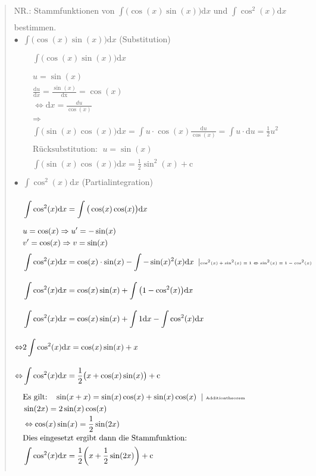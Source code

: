 \begin{quote}
NR.: Stammfunktionen von $ \int\limits_{}^{}\big(\cos(x)\sin(x)\big) \mathrm{d}x $ und $ \int\limits_{}^{} \cos^2(x)\mathrm{d}x $ bestimmen.\\
	$ \bullet\;\;  \int\limits_{}^{}\big(\cos(x)\sin(x)\big)\mathrm{d}x$ (Substitution)
	\begin{align*}
	&\int\limits_{}^{}\big(\cos(x)\sin(x)\big)\mathrm{d}x\\
	&u=\sin(x)\\
	&\frac{\mathrm{d}u}{\mathrm{d}x}=\frac{\sin(x)}{\mathrm{dx}}=\cos(x)\\
	&\Leftrightarrow \mathrm{d}x=\frac{du}{\cos(x)}\\
	&\Rightarrow\\
	&\int\limits_{}^{} \big(\sin(x)\cos(x)\big)\mathrm{d}x=\int\limits_{}^{} u \cdot \cos(x)\frac{\mathrm{d}u}{\cos(x)}=\int\limits_{}^{} u\cdot \mathrm{d}u=\frac{1}{2}u^2\\
	&\text{Rücksubstitution: }\;u=\sin(x)\\
	&\int\limits_{}^{} \big(\sin(x)\cos(x)\big)\mathrm{d}x=\frac{1}{2}\sin^2(x)+\mathrm{c}
	\end{align*}
		$ \bullet\;\;  \int\limits_{}^{}\cos^2(x)\mathrm{d}x$ (Partialintegration)\\
		\begin{align*}
		&\int\limits_{}^{} \cos^2(x)\mathrm{d}x=\int\limits_{}^{} \big(\cos(x)\cos(x)\big)\mathrm{d}x\\
		&u=\cos(x)\Rightarrow u'=-\sin(x)\\
		&v'=\cos(x)\Rightarrow v=\sin(x)\\
		&\int\limits_{}^{} \cos^2(x)\mathrm{d}x=\cos(x)\cdot \sin(x)-\int\limits_{}^{} -\sin(x)^2(x)\mathrm{d}x\;\;\arrowvert\text{\tiny $ \cos^2(x)+\sin^2(x)=1\Leftrightarrow \sin^2(x)=1-\cos^2(x) $ }\\
		&\int\limits_{}^{} \cos^2(x)\mathrm{d}x=\cos(x)\sin(x)+\int\limits_{}^{} \big(1-\cos^2(x)\big)\mathrm{d}x\\
		&\int\limits_{}^{} \cos^2(x)\mathrm{d}x=\cos(x)\sin(x)+\int\limits_{}^{} 1\mathrm{d}x-\int\limits_{}^{} \cos^2(x)\mathrm{d}x\\
		\Leftrightarrow&2\int\limits_{}^{} \cos^2(x)\mathrm{d}x=\cos(x)\sin(x)+x\\
		\Leftrightarrow&\int\limits_{}^{} \cos^2(x)\mathrm{d}x=\frac{1}{2}\big(x+\cos(x)\sin(x)\big)+\mathrm{c}\\
		&\text{Es gilt: }\;\;\sin(x+x)=\sin(x)\cos(x)+\sin(x)\cos(x)\;\;|\text{ \tiny Additiontheorem}\\
		&\sin(2x)=2\sin(x)\cos(x)\\
		&\Leftrightarrow \cos(x)\sin(x)=\frac{1}{2}\sin(2x)\\
		&\text{Dies eingesetzt ergibt dann die Stammfunktion: }\\
		&\int\limits_{}^{} \cos^2(x)\mathrm{d}x=\frac{1}{2}\bigg(x+\frac{1}{2}\sin(2x)\bigg)+\mathrm{c}\\
		\end{align*}
\end{quote}
